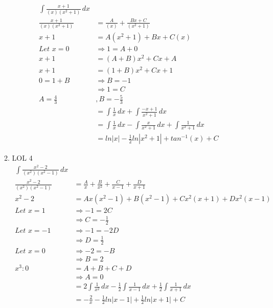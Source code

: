 \documentclass{article}
\begin{document}
\begin{enumerate}
\begin{enumerate}
\begin{align*}
                \int \frac{x+1}{(x)(x^2+1)} \,dx \\
                \frac {x+1}{(x)(x^2+1)}&=\frac{A}{(x)}+\frac{Bx+C}{(x^2+1)} \\
                x+1&=A(x^2+1)+Bx+C(x) \\
                \textit{Let $x=0$}&\Rightarrow 1=A+0 \\
                x+1&=(A+B)x^2+Cx+A \\
                x+1&=(1+B)x^2+Cx+1 \\
                0=1+B&\Rightarrow B=-1\\
                &\Rightarrow 1=C \\
                A=\frac{4}{3}&,B=-\frac{5}{3}\\
                &=\int\frac{1}{x}\,dx + \int\frac{-x+1}{x^2+1}\,dx  \\
                &=\int\frac{1}{x}\,dx - \int\frac{x}{x^2+1}\,dx + \int\frac{1}{x^2+1}\,dx  \\
                &=ln|x|-\frac{1}{2}ln|x^2+1|+tan^{-1}(x)+C
            \end{align*}
            \item LOL 4
            \begin{align*}
                \int \frac{x^2-2}{(x^2)(x^2-1)} \,dx \\
                \frac{x^2-2}{(x^2)(x^2-1)}&=\frac{A}{x}+\frac{B}{x^2}+\frac{C}{x-1}+\frac{D}{x+1} \\
                x^2-2&=Ax(x^2-1)+B(x^2-1)+Cx^2(x+1)+Dx^2(x-1)\\
                \textit{Let $x=1$}&\Rightarrow -1=2C \\
                &\Rightarrow C=-\frac{1}{2} \\
                \textit{Let $x=-1$}&\Rightarrow -1=-2D \\
                &\Rightarrow D=\frac{1}{2} \\
                \textit{Let $x=0$}&\Rightarrow -2=-B \\
                &\Rightarrow B=2\\
                x^3: 0&=A+B+C+D \\
                &\Rightarrow A=0\\
                &=2\int\frac{1}{x^2}\,dx - \frac{1}{2}\int\frac{1}{x-1}\,dx + \frac{1}{2}\int\frac{1}{x+1}\,dx \\
                &=-\frac{2}{x}-\frac{1}{2}ln|x-1|+\frac{1}{2}ln|x+1|+C
            \end{align*}
        \end{enumerate}
\end{enumerate}
\end{document}
